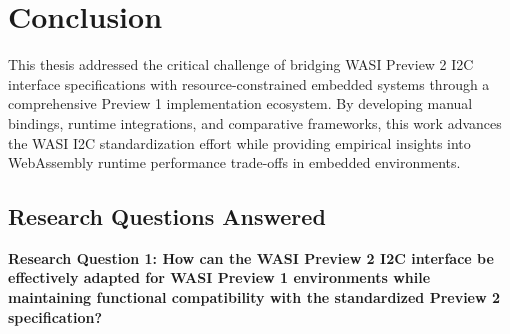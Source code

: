 \chapter*{Conclusion}
\label{chap:conclusion}

This thesis addressed the critical challenge of bridging WASI Preview 2 I2C interface specifications with resource-constrained embedded systems through a comprehensive Preview 1 implementation ecosystem. By developing manual bindings, runtime integrations, and comparative frameworks, this work advances the WASI I2C standardization effort while providing empirical insights into WebAssembly runtime performance trade-offs in embedded environments.




\section*{Research Questions Answered}
\label{sec:research-questions-answered}

\textbf{Research Question 1: How can the WASI Preview 2 I2C interface be effectively adapted for WASI Preview 1 environments while maintaining functional compatibility with the standardized Preview 2 specification?}

